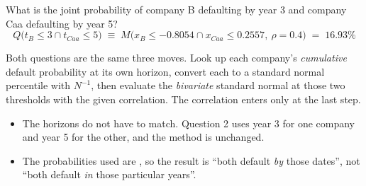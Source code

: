 \begin{mrexbox}[title={Question 2 --- different years for each company}]
What is the joint probability of company B defaulting by year 3 and company Caa defaulting by
year 5?
\tcblower
\small
\[ Q\bigl(t_B \le 3 \cap t_{Caa} \le 5\bigr) \;\equiv\;
   M\bigl( x_B \le -0.8054 \cap x_{Caa} \le 0.2557,\ \rho = 0.4 \bigr) \;=\; \mathbf{16.93\%} \]
\end{mrexbox}

\begin{mrkeybox}[title={The shape of the calculation}]
Both questions are the same three moves. Look up each company's \textit{cumulative} default
probability at its own horizon, convert each to a standard normal percentile with $N^{-1}$, then
evaluate the \textit{bivariate} standard normal at those two thresholds with the given
correlation. The correlation enters only at the last step.
\end{mrkeybox}

\begin{mrtrapbox}[title={Two things to watch}]
\begin{itemize}
\item The horizons do not have to match. Question 2 uses year 3 for one company and year 5 for
      the other, and the method is unchanged.
\item The probabilities used are , so the result is ``both default \textit{by}
      those dates'', not ``both default \textit{in} those particular years''.
\end{itemize}
\end{mrtrapbox}


